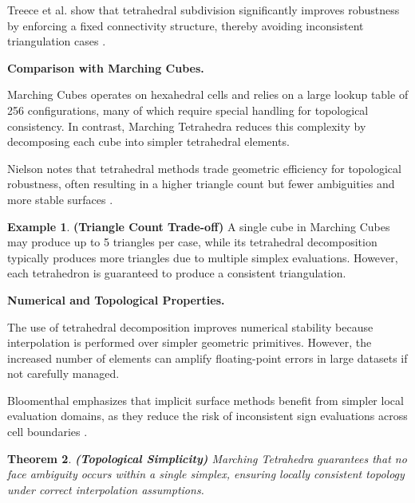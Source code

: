 \documentclass[12pt, a4paper, oneside]{book}
\theoremstyle{plain}
\newtheorem{theorem}{Theorem}[chapter]
\theoremstyle{definition}
\newtheorem{example}[theorem]{Example}
\theoremstyle{remark}
\theoremstyle{definition}
\begin{document}
Treece et al. show that tetrahedral subdivision significantly improves robustness by enforcing a fixed connectivity structure, thereby avoiding inconsistent triangulation cases \cite{treece1999regularised}.

\vspace{0.5em}

\textbf{Comparison with Marching Cubes.}

Marching Cubes operates on hexahedral cells and relies on a large lookup table of 256 configurations, many of which require special handling for topological consistency. In contrast, Marching Tetrahedra reduces this complexity by decomposing each cube into simpler tetrahedral elements.

Nielson notes that tetrahedral methods trade geometric efficiency for topological robustness, often resulting in a higher triangle count but fewer ambiguities and more stable surfaces \cite{nielson2008dual}.

\begin{example}
    \textbf{(Triangle Count Trade-off)}
A single cube in Marching Cubes may produce up to 5 triangles per case, while its tetrahedral decomposition typically produces more triangles due to multiple simplex evaluations. However, each tetrahedron is guaranteed to produce a consistent triangulation.
\end{example}


\vspace{0.5em}

\textbf{Numerical and Topological Properties.}

The use of tetrahedral decomposition improves numerical stability because interpolation is performed over simpler geometric primitives. However, the increased number of elements can amplify floating-point errors in large datasets if not carefully managed.

Bloomenthal emphasizes that implicit surface methods benefit from simpler local evaluation domains, as they reduce the risk of inconsistent sign evaluations across cell boundaries \cite{bloomenthal1997introduction}.

\begin{theorem}
    \textbf{(Topological Simplicity)}
Marching Tetrahedra guarantees that no face ambiguity occurs within a single simplex, ensuring locally consistent topology under correct interpolation assumptions.

\end{theorem}

\vspace{0.5em}
\end{document}
